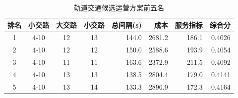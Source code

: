 \begin{table}[H]
\centering
\caption{轨道交通候选运营方案前五名}
\label{tab:rail-operation-candidates}
\small
\begin{tabular}{ccccrrrr}
\toprule
排名 & 小交路 & 大交路 & 小交路 & 总间隔(s) & 成本 & 服务指标 & 综合分 \\
\midrule
1 & 4-10 & 12 & 13 & 144.0 & 2681.2 & 186.1 & 0.4026 \\
2 & 4-10 & 12 & 12 & 150.0 & 2588.6 & 193.9 & 0.4054 \\
3 & 4-10 & 11 & 11 & 163.6 & 2372.9 & 211.5 & 0.4092 \\
4 & 4-10 & 13 & 13 & 138.5 & 2804.4 & 179.0 & 0.4141 \\
5 & 4-10 & 13 & 14 & 133.3 & 2896.9 & 172.3 & 0.4164 \\
\bottomrule
\end{tabular}
\end{table}
